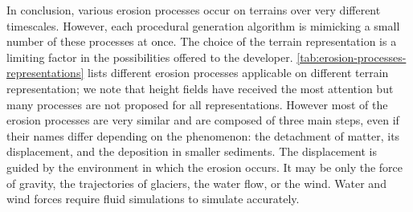 \midConclusion

In conclusion, various erosion processes occur on terrains over very different timescales. However, each procedural generation algorithm is mimicking a small number of these processes at once. The choice of the terrain representation is a limiting factor in the possibilities offered to the developer. \cref{tab:erosion-processes-representations} lists different erosion processes applicable on different terrain representation; we note that height fields have received the most attention but many processes are not proposed for all representations. However most of the erosion processes are very similar and are composed of three main steps, even if their names differ depending on the phenomenon: the detachment of matter, its displacement, and the deposition in smaller sediments. The displacement is guided by the environment in which the erosion occurs. It may be only the force of gravity, the trajectories of glaciers, the water flow, or the wind. Water and wind forces require fluid simulations to simulate accurately. 
